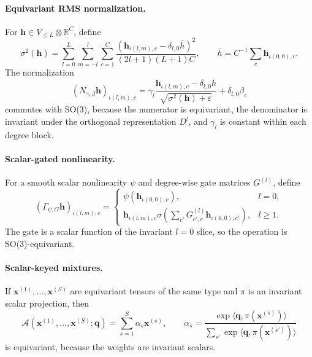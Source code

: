 \paragraph{Equivariant RMS normalization.}
For $\mathbf{h}\in V_{\le L}\otimes\mathbb{R}^{C}$, define
\begin{equation}
    \sigma^2(\mathbf{h})
    =
    \sum_{l=0}^{L}\sum_{m=-l}^{l}\sum_{c=1}^{C}
    \frac{(\mathbf{h}_{\iota(l,m),c}-\delta_{l,0}\bar{h})^2}
    {(2l+1)(L+1)C},
    \qquad
    \bar{h}=C^{-1}\sum_c \mathbf{h}_{\iota(0,0),c}.
    \label{eq:sm-rms-stat}
\end{equation}
The normalization
\begin{equation}
    (N_{\gamma,\beta}\mathbf{h})_{\iota(l,m),c}
    =
    \gamma_l
    \frac{\mathbf{h}_{\iota(l,m),c}-\delta_{l,0}\bar{h}}
    {\sqrt{\sigma^2(\mathbf{h})+\varepsilon}}
    +\delta_{l,0}\beta_c
    \label{eq:sm-rmsnorm}
\end{equation}
commutes with SO(3), because the numerator is equivariant, the denominator is
invariant under the orthogonal representation $D^l$, and $\gamma_l$ is constant
within each degree block.

\paragraph{Scalar-gated nonlinearity.}
For a smooth scalar nonlinearity $\psi$ and degree-wise gate matrices
$G^{(l)}$, define
\begin{equation}
    (\Gamma_{\psi,G}\mathbf{h})_{\iota(l,m),c}
    =
    \begin{cases}
        \psi(\mathbf{h}_{\iota(0,0),c}),                  & l=0,    \\[2pt]
        \mathbf{h}_{\iota(l,m),c}
        \sigma\!\left(\sum_{c'}
        G^{(l)}_{c',c} \mathbf{h}_{\iota(0,0),c'}\right), & l\ge 1.
    \end{cases}
    \label{eq:sm-gated}
\end{equation}
The gate is a scalar function of the invariant $l=0$ slice, so the operation is SO(3)-equivariant.

\paragraph{Scalar-keyed mixtures.}
If $\mathbf{x}^{(1)},\ldots,\mathbf{x}^{(S)}$ are equivariant tensors of the
same type and $\pi$ is an invariant scalar projection, then
\begin{equation}
    \mathcal{A}(\mathbf{x}^{(1)},\ldots,\mathbf{x}^{(S)};\mathbf{q})
    =
    \sum_{s=1}^{S}\alpha_s\mathbf{x}^{(s)},\qquad
    \alpha_s=
    \frac{\exp\langle\mathbf{q},\pi(\mathbf{x}^{(s)})\rangle}
    {\sum_{s'}\exp\langle\mathbf{q},\pi(\mathbf{x}^{(s')})\rangle}
    \label{eq:sm-scalar-keyed-mixture}
\end{equation}
is equivariant, because the weights are invariant scalars.

